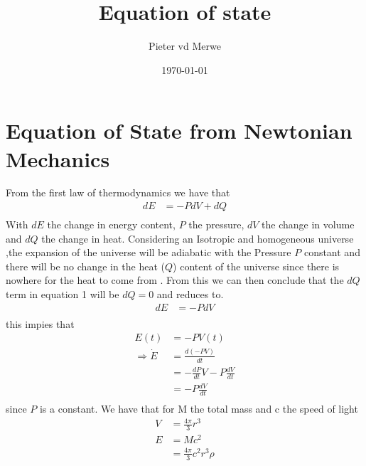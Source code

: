 \documentclass[a4paper, 11pt]{FSKH_623_Report}
\title{Equation of state}
\author{Pieter vd Merwe}
\date{\today}
\newcommand{\driv}[2]{\frac{d #1}{d #2}}
\begin{document}
\maketitle

\tableofcontents                                                  
\pagebreak
{}

\section{Equation of State from Newtonian Mechanics}

From the first law of thermodynamics we have that  
\begin{equation}
\begin{split}
dE &= -PdV + dQ\\
\end{split}
\end{equation}
With $dE$ the change in energy content, $P$ the pressure, $dV$ the change in volume and $dQ$ the change in heat.
Considering an Isotropic and homogeneous universe \citep{notes4},the expansion of the universe will be adiabatic with the Pressure $P$ constant and there will be no change in the heat ($Q$) content of the universe since there is nowhere for the heat to come from \citep{notes4}. From this we can then conclude that the $dQ$ term in equation 1 will be $dQ=0$ and reduces to.
\begin{equation}
\begin{split}
dE &= -PdV \\
\end{split}
\end{equation}
this impies that
\begin{equation}
\begin{split}
E(t) &= -PV(t)\\
\Rightarrow \dot{E} &= \frac{d\left(-PV\right)}{dt}\\
&= -\driv{P}{t}V-P\driv{V}{t}\\
&= -P\driv{V}{t}             \\
\end{split}
\end{equation}
since $P$ is a constant.
We have that for M the total mass and c the speed of light 
\begin{equation}
\begin{split}
V &= \frac{4\pi}{3}r^{3}\\
E &= Mc^{2}\\
&=\frac{4\pi}{3}c^{2}r^{3}\rho\\
\end{split}
\end{equation}
\end{document}
